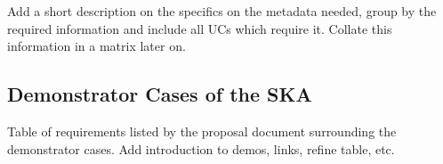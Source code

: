 Add a short description on the specifics on the metadata needed, group by the required information and include all UCs which require it. 
Collate this information in a matrix later on. 

\subsection{Demonstrator Cases of the SKA}



\newcommand{\man}[1][]{\(\CIRCLE_{#1}\)}     %
\newcommand{\opt}[1][]{\(\LEFTcircle_{#1}\)} %
\newcommand{\non}{\Circle}                   %

Table of requirements listed by the proposal document surrounding the demonstrator cases. 
Add introduction to demos, links, refine table, etc.


